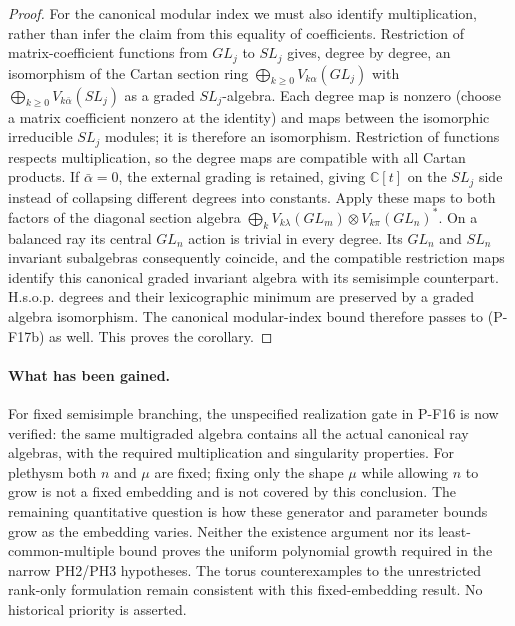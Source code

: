 \begin{proof}
For the canonical modular index we must also identify multiplication,
rather than infer the claim from this equality of coefficients.
Restriction of matrix-coefficient functions from $GL_j$ to $SL_j$
gives, degree by degree, an isomorphism of the Cartan section ring
$\bigoplus_{k\ge0}V_{k\alpha}(GL_j)$ with
$\bigoplus_{k\ge0}V_{k\bar\alpha}(SL_j)$ as a graded
$SL_j$-algebra. Each degree map is nonzero (choose a matrix coefficient
nonzero at the identity) and maps between the isomorphic irreducible
$SL_j$ modules; it is therefore an isomorphism. Restriction of
functions respects multiplication, so the degree maps are compatible
with all Cartan products. If $\bar\alpha=0$, the external grading
is retained, giving $\mathbb C[t]$ on the $SL_j$ side instead of
collapsing different degrees into constants.
Apply these maps to both factors of the diagonal section algebra
$\bigoplus_k V_{k\lambda}(GL_m)\otimes V_{k\pi}(GL_n)^*$.
On a balanced ray its central $GL_n$ action is trivial in every
degree. Its $GL_n$ and $SL_n$ invariant subalgebras consequently
coincide, and the compatible restriction maps identify this canonical
graded invariant algebra with its semisimple counterpart. H.s.o.p.
degrees and their lexicographic minimum are preserved by a graded
algebra isomorphism. The canonical modular-index bound therefore
passes to (P-F17b) as well. This proves the corollary.
\end{proof}

\paragraph{What has been gained.}
For fixed semisimple branching, the unspecified realization gate in
P-F16 is now verified: the same multigraded algebra contains all the
actual canonical ray algebras, with the required multiplication and
singularity properties. For plethysm both $n$ and $\mu$ are fixed;
fixing only the shape $\mu$ while allowing $n$ to grow is not a
fixed embedding and is not covered by this conclusion.
The remaining quantitative question is how these generator and
parameter bounds grow as the embedding varies. Neither the existence
argument nor its least-common-multiple bound proves the uniform
polynomial growth required in the narrow PH2/PH3 hypotheses. The
torus counterexamples to the unrestricted rank-only formulation
remain consistent with this fixed-embedding result. No historical
priority is asserted.
